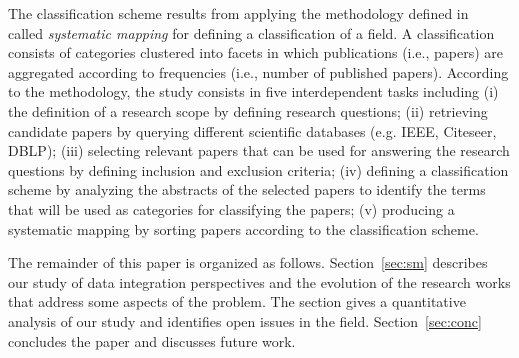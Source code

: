 The classification scheme results from  applying the  methodology defined
in~\cite{SM:Petersen:2008} called  \textit{systematic mapping}  for defining a
classification of a field. A classification consists of categories clustered
into facets in which publications (i.e., papers) are aggregated according to
frequencies (i.e., number of published papers). According to the methodology,
the study consists in  five interdependent tasks including (i) the definition of
a research scope by defining research questions; (ii) retrieving candidate
papers by querying different scientific databases (e.g. IEEE, Citeseer, DBLP);
(iii) selecting relevant papers that can be used for answering the research
questions by defining inclusion and exclusion criteria; (iv) defining a
classification scheme by analyzing the abstracts of the selected papers to
identify the terms that will be used as categories for classifying the papers;
(v) producing a systematic mapping by sorting papers according to the
classification scheme.              



The remainder of this paper is organized as follows. 
Section~\ref{sec:sm} describes our study of data integration perspectives and the evolution of the research works that address some aspects of the problem. The section gives a quantitative analysis of our study and identifies open issues in the field. 
Section~\ref{sec:conc} concludes the paper and discusses future work. 


